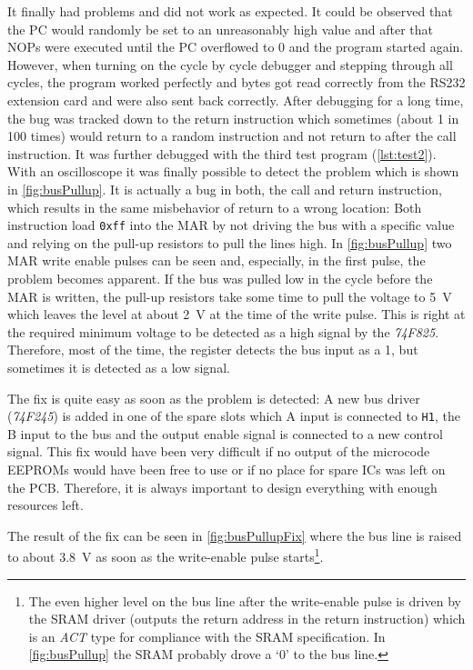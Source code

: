 It finally had problems and did not work as expected.
It could be observed that the \gls{PC} would randomly be set to an unreasonably high value and after that \glspl{NOP} were executed until the \gls{PC} overflowed to 0 and the program started again.
However, when turning on the cycle by cycle debugger and stepping through all cycles, the program worked perfectly and bytes got read correctly from the RS232 extension card and were also sent back correctly.
After debugging for a long time, the bug was tracked down to the return instruction which sometimes (about 1 in 100 times) would return to a random instruction and not return to after the call instruction.
It was further debugged with the third test program (\cref{lst:test2}).
With an oscilloscope it was finally possible to detect the problem which is shown in \cref{fig:busPullup}.
It is actually a bug in both, the call and return instruction, which results in the same misbehavior of return to a wrong location:
Both instruction load \texttt{0xff} into the \gls{MAR} by not driving the bus with a specific value and relying on the pull-up resistors to pull the lines high.
In \cref{fig:busPullup} two \gls{MAR} write enable pulses can be seen and, especially, in the first pulse, the problem becomes apparent.
If the bus was pulled low in the cycle before the \gls{MAR} is written, the pull-up resistors take some time to pull the voltage to \qty{5}{\volt} which leaves the level at about \qty{2}{\volt} at the time of the write pulse.
This is right at the required minimum voltage to be detected as a high signal by the \emph{74F825}.
Therefore, most of the time, the register detects the bus input as a 1, but sometimes it is detected as a low signal.

The fix is quite easy as soon as the problem is detected:
A new bus driver (\emph{74F245}) is added in one of the spare slots which A input is connected to \texttt{H1}, the B input to the bus and the output enable signal is connected to a new control signal.
This fix would have been very difficult if no output of the microcode \glspl{EEPROM} would have been free to use or if no place for spare \glspl{IC} was left on the \gls{PCB}.
Therefore, it is always important to design everything with enough resources left.

The result of the fix can be seen in \cref{fig:busPullupFix} where the bus line is raised to about \qty{3.8}{\volt} as soon as the write-enable pulse starts\footnote{The even higher level on the bus line after the write-enable pulse is driven by the \gls{SRAM} driver (outputs the return address in the return instruction) which is an \emph{ACT} type for compliance with the \gls{SRAM} specification. In \cref{fig:busPullup} the \gls{SRAM} probably drove a `0' to the bus line.}.

